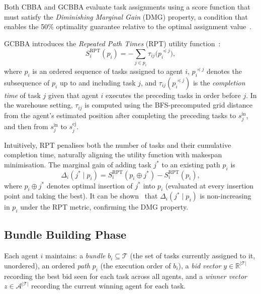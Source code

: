 Both CBBA and GCBBA evaluate task assignments using a score function that
must satisfy the \emph{Diminishing Marginal Gain} (DMG) property, a condition
that enables the 50\% optimality guarantee relative to the optimal assignment
value~\cite{fisher1978analysis}.

GCBBA introduces the \emph{Repeated Path Times} (RPT) utility
function~\cite{kha2025enhancing}:
\begin{equation}
  S_i^{\text{RPT}}(p_i) = -\sum_{j \in p_i}
    \tau_{ij}\!\bigl(p_i^{\preceq j}\bigr),
  \label{eq:rpt}
\end{equation}
where $p_i$ is an ordered sequence of tasks assigned to agent $i$,
$p_i^{\preceq j}$ denotes the subsequence of $p_i$ up to and including task $j$,
and $\tau_{ij}(p_i^{\preceq j})$ is the \emph{completion time} of task $j$
given that agent $i$ executes the preceding tasks in order before $j$.
In the warehouse setting, $\tau_{ij}$ is computed using the BFS-precomputed
grid distance from the agent's estimated position after completing the
preceding tasks to $s_j^{\text{in}}$, and then from $s_j^{\text{in}}$ to
$s_j^{\text{ej}}$.

Intuitively, RPT penalises both the number of tasks and their cumulative
completion time, naturally aligning the utility function with makespan
minimisation.
The marginal gain of adding task $j^*$ to an existing path $p_i$ is
\begin{equation}
  \Delta_i(j^* \mid p_i) = S_i^{\text{RPT}}(p_i \oplus j^*) - S_i^{\text{RPT}}(p_i),
  \label{eq:marginal}
\end{equation}
where $p_i \oplus j^*$ denotes optimal insertion of $j^*$ into $p_i$
(evaluated at every insertion point and taking the best).
It can be shown~\cite{kha2025enhancing} that $\Delta_i(j^* \mid p_i)$ is
non-increasing in $p_i$ under the RPT metric, confirming the DMG property.


\subsection{Bundle Building Phase}
\label{subsec:method_bundle}

Each agent $i$ maintains:
a \emph{bundle} $b_i \subseteq \mathcal{T}$ (the set of tasks currently
assigned to it, unordered),
an ordered \emph{path} $p_i$ (the execution order of $b_i$),
a \emph{bid vector} $y \in \mathbb{R}^{|\mathcal{T}|}$ recording the best bid
seen for each task across all agents, and
a \emph{winner vector} $z \in \mathcal{A}^{|\mathcal{T}|}$ recording the
current winning agent for each task.

